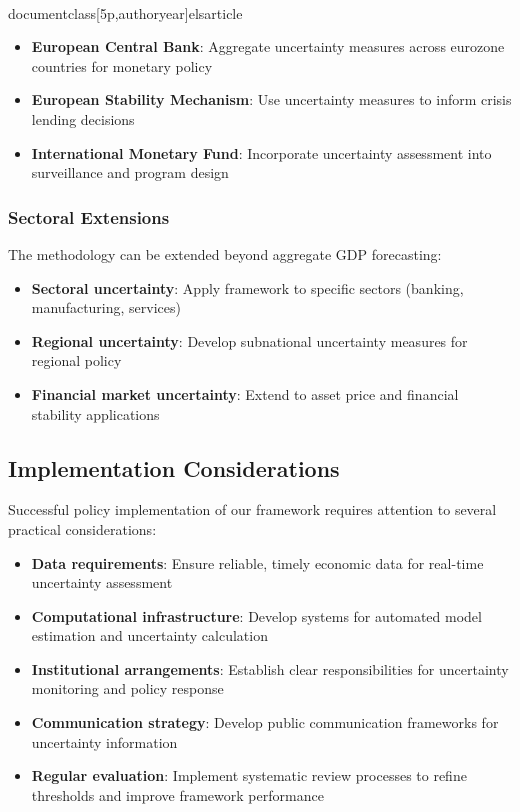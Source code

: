 \\documentclass[5p,authoryear]{elsarticle}
\begin{document}
{\begin{itemize}
    \item \textbf{European Central Bank}: Aggregate uncertainty measures across eurozone countries for monetary policy
    \item \textbf{European Stability Mechanism}: Use uncertainty measures to inform crisis lending decisions
    \item \textbf{International Monetary Fund}: Incorporate uncertainty assessment into surveillance and program design
\end{itemize}

\subsubsection{Sectoral Extensions}
The methodology can be extended beyond aggregate GDP forecasting:

\begin{itemize}
    \item \textbf{Sectoral uncertainty}: Apply framework to specific sectors (banking, manufacturing, services)
    \item \textbf{Regional uncertainty}: Develop subnational uncertainty measures for regional policy
    \item \textbf{Financial market uncertainty}: Extend to asset price and financial stability applications
\end{itemize}

\subsection{Implementation Considerations}

Successful policy implementation of our framework requires attention to several practical considerations:

\begin{itemize}
    \item \textbf{Data requirements}: Ensure reliable, timely economic data for real-time uncertainty assessment
    \item \textbf{Computational infrastructure}: Develop systems for automated model estimation and uncertainty calculation
    \item \textbf{Institutional arrangements}: Establish clear responsibilities for uncertainty monitoring and policy response
    \item \textbf{Communication strategy}: Develop public communication frameworks for uncertainty information
    \item \textbf{Regular evaluation}: Implement systematic review processes to refine thresholds and improve framework performance
\end{itemize}

}
\end{document}
